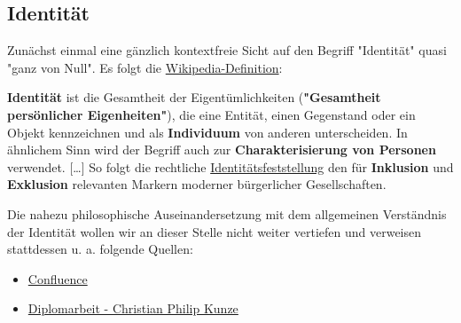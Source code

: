 
\subsection{Identität}
\label{sec:einleitung_identitaet}

Zunächst einmal eine gänzlich kontextfreie Sicht auf den Begriff "Identität" quasi "ganz von Null". Es folgt die \href{https://de.wikipedia.org/wiki/Identit%C3%A4t}{Wikipedia-Definition}:

\vspace{0.3cm}

\begin{Business-Def}[Identität]\label{defIdentity}

\textbf{Identität} ist die Gesamtheit der Eigentümlichkeiten (\textbf{"Gesamtheit persönlicher Eigenheiten"}), die eine Entität, einen Gegenstand oder ein Objekt kennzeichnen und als \textbf{Individuum} von anderen unterscheiden. In ähnlichem Sinn wird der Begriff auch zur \textbf{Charakterisierung von Personen} verwendet. […] So folgt die rechtliche \href{https://de.wikipedia.org/wiki/Identit%C3%A4tsfeststellung}{Identitätsfeststellung} den für \textbf{Inklusion} und \textbf{Exklusion} relevanten Markern moderner bürgerlicher Gesellschaften.

\end{Business-Def}

\vspace{0.3cm}

Die nahezu philosophische Auseinandersetzung mit dem allgemeinen Verständnis der Identität wollen wir an dieser Stelle nicht weiter vertiefen und verweisen stattdessen u. a. folgende Quellen:

\vspace{0.3cm}

\begin{Quelle}

\begin{itemize}
  \item \href{https://blockchainopedia.atlassian.net/wiki/spaces/RESEARCH/pages/81264861/Digitale+Identit+t+-+eine+allgemeine+Sicht}{Confluence}
  \item \href{https://vsis-www.informatik.uni-hamburg.de/getDoc.php/publications/191/InfTage_CPK.pdf}{Diplomarbeit - Christian Philip Kunze}
\end{itemize}

\end{Quelle}

